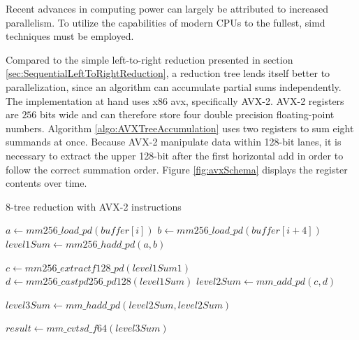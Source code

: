 Recent advances in computing power can largely be attributed to increased parallelism.
To utilize the capabilities of modern CPUs to the fullest, \gls{simd} techniques must be employed.

Compared to the simple left-to-right reduction presented in section
\ref{sec:SequentialLeftToRightReduction}, a reduction tree lends itself better to parallelization, since an algorithm can accumulate partial sums independently. The implementation at hand uses x86 \gls{avx}, specifically AVX-2.
AVX-2 registers are $256$ bits wide and can therefore store four double precision floating-point numbers. Algorithm \ref{algo:AVXTreeAccumulation} uses two registers to sum eight summands at once.
Because AVX-2 manipulate data within 128-bit lanes, it is necessary to extract the upper 128-bit after the first horizontal add in order to follow the correct summation order.
Figure \ref{fig:avxSchema} displays the register contents over time.


\begin{algorithm}
\caption{8-tree reduction with AVX-2 instructions}
\label{algo:AVXTreeAccumulation}
\DontPrintSemicolon
\SetAlgoLined

$a \gets mm256\_load\_pd(buffer[i])$\;
$b \gets mm256\_load\_pd(buffer[i + 4])$\;
$level1Sum \gets mm256\_hadd\_pd(a,b)$\;

$c \gets mm256\_extractf128\_pd(level1Sum 1)$\;
$d \gets mm256\_castpd256\_pd128(level1Sum)$\;
$level2Sum \gets mm\_add\_pd(c, d)$\;

$level3Sum \gets mm\_hadd\_pd(level2Sum, level2Sum)$\;

$result \gets mm\_cvtsd\_f64(level3Sum)$\;
\end{algorithm}

